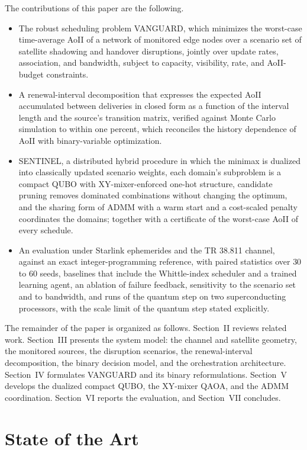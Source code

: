 The contributions of this paper are the following.
\begin{itemize}[leftmargin=13pt]
\item The robust scheduling problem VANGUARD, which minimizes the worst-case time-average AoII of a network of
monitored edge nodes over a scenario set of satellite shadowing and handover disruptions, jointly over update rates,
association, and bandwidth, subject to capacity, visibility, rate, and AoII-budget constraints.
\item A renewal-interval decomposition that expresses the expected AoII accumulated between deliveries in closed form
as a function of the interval length and the source's transition matrix, verified against Monte Carlo simulation to
within one percent, which reconciles the history dependence of AoII with binary-variable optimization.
\item SENTINEL, a distributed hybrid procedure in which the minimax is dualized into classically updated scenario
weights, each domain's subproblem is a compact QUBO with XY-mixer-enforced one-hot structure, candidate pruning
removes dominated combinations without changing the optimum, and the sharing form of ADMM with a warm start and a
cost-scaled penalty coordinates the domains; together with a certificate of the worst-case AoII of every schedule.
\item An evaluation under Starlink ephemerides and the TR 38.811 channel, against an exact integer-programming
reference, with paired statistics over 30 to 60 seeds, baselines that include the Whittle-index scheduler and a
trained learning agent, an ablation of failure feedback, sensitivity to the scenario set and to bandwidth, and runs of
the quantum step on two superconducting processors, with the scale limit of the quantum step stated explicitly.
\end{itemize}

The remainder of the paper is organized as follows. Section~II reviews related work. Section~III presents the system
model: the channel and satellite geometry, the monitored sources, the disruption scenarios, the renewal-interval
decomposition, the binary decision model, and the orchestration architecture. Section~IV formulates VANGUARD and its
binary reformulations. Section~V develops the dualized compact QUBO, the XY-mixer QAOA, and the ADMM coordination.
Section~VI reports the evaluation, and Section~VII concludes.

\section{State of the Art}

